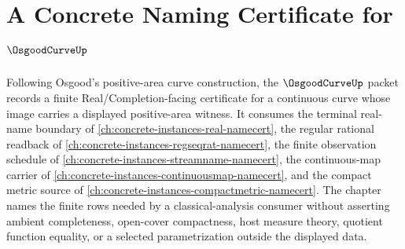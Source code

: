 \chapter{A Concrete Naming Certificate for $\OsgoodCurveUp$}
\label{ch:concrete-instances-osgood-curve-namecert}

Following Osgood's positive-area curve construction, the $\OsgoodCurveUp$ packet records a finite Real/Completion-facing certificate for a continuous curve whose image carries a displayed positive-area witness. It consumes the terminal real-name boundary of \autoref{ch:concrete-instances-real-namecert}, the regular rational readback of \autoref{ch:concrete-instances-regseqrat-namecert}, the finite observation schedule of \autoref{ch:concrete-instances-streamname-namecert}, the continuous-map carrier of \autoref{ch:concrete-instances-continuousmap-namecert}, and the compact metric source of \autoref{ch:concrete-instances-compactmetric-namecert}. The chapter names the finite rows needed by a classical-analysis consumer without asserting ambient completeness, open-cover compactness, host measure theory, quotient function equality, or a selected parametrization outside the displayed data.


